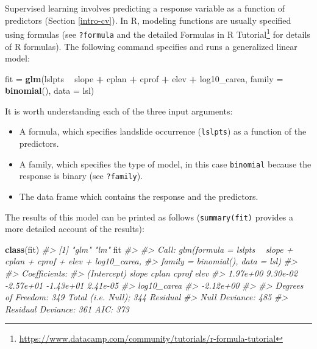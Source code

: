 \documentclass[]{krantz}
\newenvironment{Shaded}{\begin{snugshade}}{\end{snugshade}}
\newcommand{\CommentTok}[1]{\textcolor[rgb]{0.37,0.37,0.37}{\textit{#1}}}
\newcommand{\DataTypeTok}[1]{\textcolor[rgb]{0.27,0.27,0.27}{#1}}
\newcommand{\KeywordTok}[1]{\textcolor[rgb]{0.27,0.27,0.27}{\textbf{#1}}}
\newcommand{\NormalTok}[1]{#1}
\newcommand{\OperatorTok}[1]{\textcolor[rgb]{0.43,0.43,0.43}{\textbf{#1}}}
\newcommand{\StringTok}[1]{\textcolor[rgb]{0.5,0.5,0.5}{#1}}
\providecommand{\tightlist}{%
  \setlength{\itemsep}{0pt}\setlength{\parskip}{0pt}}
\let\rmarkdownfootnote\footnote%
\def\footnote{\protect\rmarkdownfootnote}
\renewcommand{\href}[2]{#2\footnote{\url{#1}}}
\begin{document}
Supervised learning involves predicting a response variable as a function of predictors (Section \ref{intro-cv}).
In R, modeling functions are usually specified using formulas (see \texttt{?formula} and the detailed \href{https://www.datacamp.com/community/tutorials/r-formula-tutorial}{Formulas in R Tutorial} for details of R formulas).
The following command specifies and runs a generalized linear model:

\begin{Shaded}
\begin{Highlighting}[]
\NormalTok{fit =}\StringTok{ }\KeywordTok{glm}\NormalTok{(lslpts }\OperatorTok{~}\StringTok{ }\NormalTok{slope }\OperatorTok{+}\StringTok{ }\NormalTok{cplan }\OperatorTok{+}\StringTok{ }\NormalTok{cprof }\OperatorTok{+}\StringTok{ }\NormalTok{elev }\OperatorTok{+}\StringTok{ }\NormalTok{log10_carea,}
          \DataTypeTok{family =} \KeywordTok{binomial}\NormalTok{(),}
          \DataTypeTok{data =}\NormalTok{ lsl)}
\end{Highlighting}
\end{Shaded}

It is worth understanding each of the three input arguments:

\begin{itemize}
\tightlist
\item
  A formula, which specifies landslide occurrence (\texttt{lslpts}) as a function of the predictors.
\item
  A family, which specifies the type of model, in this case \texttt{binomial} because the response is binary (see \texttt{?family}).
\item
  The data frame which contains the response and the predictors.
\end{itemize}

The results of this model can be printed as follows (\texttt{summary(fit)} provides a more detailed account of the results):

\begin{Shaded}
\begin{Highlighting}[]
\KeywordTok{class}\NormalTok{(fit)}
\CommentTok{#> [1] "glm" "lm"}
\NormalTok{fit}
\CommentTok{#> }
\CommentTok{#> Call:  glm(formula = lslpts ~ slope + cplan + cprof + elev + log10_carea, }
\CommentTok{#>     family = binomial(), data = lsl)}
\CommentTok{#> }
\CommentTok{#> Coefficients:}
\CommentTok{#> (Intercept)        slope        cplan        cprof         elev  }
\CommentTok{#>    1.97e+00     9.30e-02    -2.57e+01    -1.43e+01     2.41e-05  }
\CommentTok{#> log10_carea  }
\CommentTok{#>   -2.12e+00  }
\CommentTok{#> }
\CommentTok{#> Degrees of Freedom: 349 Total (i.e. Null);  344 Residual}
\CommentTok{#> Null Deviance:       485 }
\CommentTok{#> Residual Deviance: 361   AIC: 373}
\end{Highlighting}
\end{Shaded}
\end{document}
